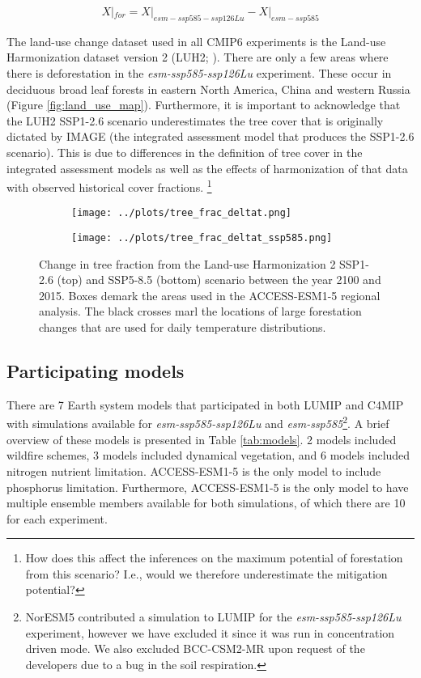 \documentclass[]{article}
\begin{document}
\begin{equation}
    X|_{for} = X|_{esm-ssp585-ssp126Lu} - X|_{esm-ssp585}
    \label{equ:diff}
\end{equation}

The land-use change dataset used in all CMIP6 experiments is the Land-use Harmonization dataset version 2 (LUH2; \cite{hurtt_harmonization_2020}).
There are only a few areas where there is deforestation in the \textit{esm-ssp585-ssp126Lu} experiment.
These occur in deciduous broad leaf forests in eastern North America, China and western Russia (Figure \ref{fig:land_use_map}).
Furthermore, it is important to acknowledge that the LUH2 SSP1-2.6 scenario underestimates the tree cover that is originally dictated by IMAGE (the integrated assessment model that produces the SSP1-2.6 scenario).
This is due to differences in the definition of tree cover in the integrated assessment models as well as the effects of harmonization of that data with observed historical cover fractions. \footnote{How does this affect the inferences on the maximum potential of forestation from this scenario? I.e., would we therefore underestimate the mitigation potential?}

\begin{figure}[H]
    \centering
    \begin{subfigure}[b]{\linewidth}
        \texttt{[image: ../plots/tree\_frac\_deltat.png]}
    \end{subfigure}
    \begin{subfigure}[b]{\linewidth}
        \texttt{[image: ../plots/tree\_frac\_deltat\_ssp585.png]}
    \end{subfigure}
    \caption{Change in tree fraction from the Land-use Harmonization 2 SSP1-2.6 (top) and SSP5-8.5 (bottom) scenario between the year 2100 and 2015. Boxes demark the areas used in the ACCESS-ESM1-5 regional analysis. The black crosses marl the locations of large forestation changes that are used for daily temperature distributions.}
    \label{fig:land_use}
\end{figure}

\subsection{Participating models}

There are 7 Earth system models that participated in both LUMIP and C4MIP with simulations available for \textit{esm-ssp585-ssp126Lu} and \textit{esm-ssp585}\footnote{NorESM5 contributed a simulation to LUMIP for the \textit{esm-ssp585-ssp126Lu} experiment, however we have excluded it since it was run in concentration driven mode. We also excluded BCC-CSM2-MR upon request of the developers due to a bug in the soil respiration.}.
A brief overview of these models is presented in Table \ref{tab:models}.
2 models included wildfire schemes, 3 models included dynamical vegetation, and 6 models included nitrogen nutrient limitation.
ACCESS-ESM1-5 is the only model to include phosphorus limitation.
Furthermore, ACCESS-ESM1-5 is the only model to have multiple ensemble members available for both simulations, of which there are 10 for each experiment.
\end{document}
